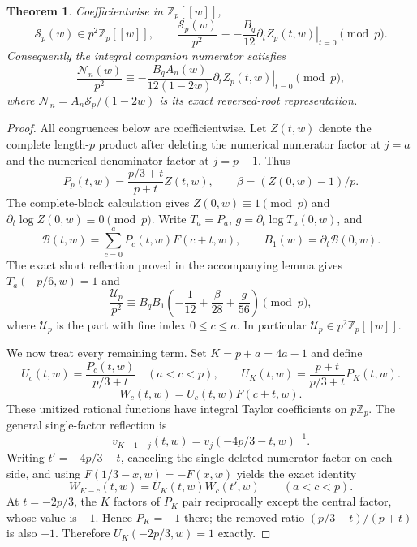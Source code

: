 \documentclass[11pt,letterpaper]{article}
\newtheorem{theorem}{Theorem}[section]
\numberwithin{equation}{section}
\begin{document}
\begin{theorem}\label{VIII-E8:full-block-derivative}
Coefficientwise in $\mathbb Z_p[[w]]$,
\[
 \mathcal S_p(w)\in p^2\mathbb Z_p[[w]],\qquad
 \boxed{\frac{\mathcal S_p(w)}{p^2}
 \equiv-\frac{B_q}{12}\left.\partial_t Z_p(t,w)\right|_{t=0}
 \pmod p.}
\]
Consequently the integral companion numerator satisfies
\[
 \boxed{\frac{\mathcal N_n(w)}{p^2}
 \equiv-\frac{B_q A_n(w)}{12(1-2w)}
 \left.\partial_t Z_p(t,w)\right|_{t=0}\pmod p,}
\]
where $\mathcal N_n=A_n\mathcal S_p/(1-2w)$ is its exact
reversed-root representation.
\end{theorem}

\begin{proof}
All congruences below are coefficientwise. Let $Z(t,w)$ denote the
complete length-$p$ product after deleting the numerical numerator
factor at $j=a$ and the numerical denominator factor at $j=p-1$.
Thus
\[
 P_p(t,w)=\frac{p/3+t}{p+t}Z(t,w),\qquad
 \beta=(Z(0,w)-1)/p.
\]
The complete-block calculation gives $Z(0,w)\equiv1\pmod p$ and
$\partial_t\log Z(0,w)\equiv0\pmod p$.
Write $T_a=P_a$, $g=\partial_t\log T_a(0,w)$, and
\[
 \mathcal B(t,w)=\sum_{c=0}^aP_c(t,w)F(c+t,w),\qquad
 B_1(w)=\partial_t\mathcal B(0,w).
\]
The exact short reflection proved in the accompanying lemma gives
$T_a(-p/6,w)=1$ and
\begin{equation}\label{VIII-E8:U-intermediate}
 \frac{\mathcal U_p}{p^2}
 \equiv B_qB_1\left(-\frac1{12}+\frac\beta{28}+\frac g{56}\right)
 \pmod p,
\end{equation}
where $\mathcal U_p$ is the part with fine index $0\le c\le a$.
In particular $\mathcal U_p\in p^2\mathbb Z_p[[w]]$.

We now treat every remaining term. Set $K=p+a=4a-1$ and define
\[
 U_c(t,w)=\frac{P_c(t,w)}{p/3+t}\quad(a<c<p),\qquad
 U_K(t,w)=\frac{p+t}{p/3+t}P_K(t,w).
\]
\[
 W_c(t,w)=U_c(t,w)F(c+t,w).
\]
These unitized rational functions have integral Taylor coefficients
on $p\mathbb Z_p$. The general single-factor reflection is
\[
 v_{K-1-j}(t,w)=v_j(-4p/3-t,w)^{-1}.
\]
Writing $t'=-4p/3-t$, canceling the single deleted numerator factor
on each side, and using $F(1/3-x,w)=-F(x,w)$ yields the exact identity
\begin{equation}\label{VIII-E8:carry-reflection}
 W_{K-c}(t,w)=U_K(t,w)W_c(t',w)
 \qquad(a<c<p).
\end{equation}
At $t=-2p/3$, the $K$ factors of $P_K$ pair reciprocally except
the central factor, whose value is $-1$. Hence $P_K=-1$ there;
the removed ratio $(p/3+t)/(p+t)$ is also $-1$. Therefore
$U_K(-2p/3,w)=1$ exactly.


\end{proof}
\end{document}
